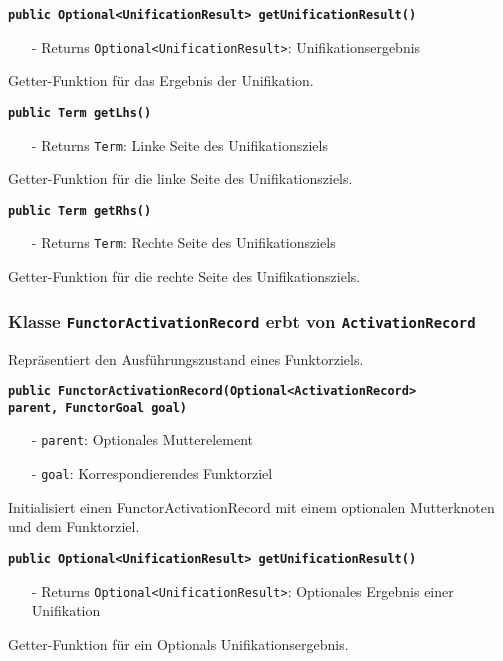 \documentclass[parskip=full,11pt,twoside]{scrartcl}
\begin{document}
\textbf{\texttt{public Optional<UnificationResult> getUnificationResult()}}
\begin{itemize}[noitemsep]
	\item[-] Returns \texttt{Optional<UnificationResult>}: Unifikationsergebnis
\end{itemize}
Getter-Funktion für das Ergebnis der Unifikation.

\textbf{\texttt{public Term getLhs()}}
\begin{itemize}[noitemsep]
	\item[-] Returns \texttt{Term}: Linke Seite des Unifikationsziels
\end{itemize}
Getter-Funktion für die linke Seite des Unifikationsziels.

\textbf{\texttt{public Term getRhs()}}
\begin{itemize}[noitemsep]
	\item[-] Returns \texttt{Term}: Rechte Seite des Unifikationsziels
\end{itemize}
Getter-Funktion für die rechte Seite des Unifikationsziels.

\subsubsection{Klasse \texttt{FunctorActivationRecord} erbt von \texttt{ActivationRecord}}

Repräsentiert den Ausführungszustand eines Funktorziels.

\textbf{\texttt{public FunctorActivationRecord(Optional<ActivationRecord>\\ parent, FunctorGoal goal)}}
\begin{itemize}[noitemsep]
	\item[-] \texttt{parent}: Optionales Mutterelement
	\item[-] \texttt{goal}: Korrespondierendes Funktorziel
\end{itemize}
Initialisiert einen FunctorActivationRecord mit einem optionalen Mutterknoten und dem Funktorziel.

\textbf{\texttt{public Optional<UnificationResult> getUnificationResult()}}
\begin{itemize}[noitemsep]
	\item[-] Returns \texttt{Optional<UnificationResult>}: Optionales Ergebnis einer Unifikation
\end{itemize}
Getter-Funktion für ein Optionals Unifikationsergebnis.
\end{document}

